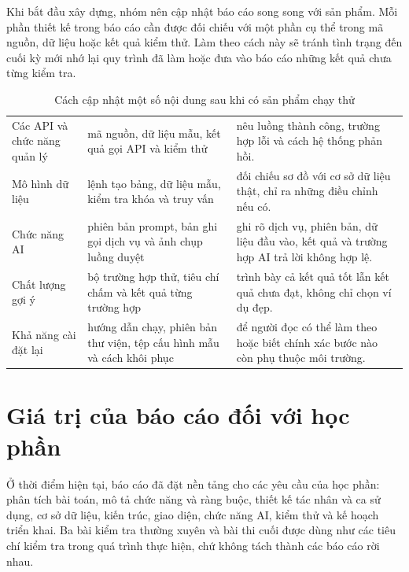 Khi bắt đầu xây dựng, nhóm nên cập nhật báo cáo song song với sản phẩm. Mỗi phần thiết kế trong báo cáo cần được đối chiếu với một phần cụ thể trong mã nguồn, dữ liệu hoặc kết quả kiểm thử. Làm theo cách này sẽ tránh tình trạng đến cuối kỳ mới nhớ lại quy trình đã làm hoặc đưa vào báo cáo những kết quả chưa từng kiểm tra.

\begin{table}[h!]
\centering
\small
\caption{Cách cập nhật một số nội dung sau khi có sản phẩm chạy thử}\label{tab:v8-update-protocol}
\begin{tabularx}{\textwidth}{|L{4.0cm}|L{4.0cm}|Y|}
\hline
{} &  & \\
\hline
Các API và chức năng quản lý & mã nguồn, dữ liệu mẫu, kết quả gọi API và kiểm thử & nêu luồng thành công, trường hợp lỗi và cách hệ thống phản hồi.\\
\hline
Mô hình dữ liệu & lệnh tạo bảng, dữ liệu mẫu, kiểm tra khóa và truy vấn & đối chiếu sơ đồ với cơ sở dữ liệu thật, chỉ ra những điều chỉnh nếu có.\\
\hline
Chức năng AI & phiên bản prompt, bản ghi gọi dịch vụ và ảnh chụp luồng duyệt & ghi rõ dịch vụ, phiên bản, dữ liệu đầu vào, kết quả và trường hợp AI trả lời không hợp lệ.\\
\hline
Chất lượng gợi ý & bộ trường hợp thử, tiêu chí chấm và kết quả từng trường hợp & trình bày cả kết quả tốt lẫn kết quả chưa đạt, không chỉ chọn ví dụ đẹp.\\
\hline
Khả năng cài đặt lại & hướng dẫn chạy, phiên bản thư viện, tệp cấu hình mẫu và cách khôi phục & để người đọc có thể làm theo hoặc biết chính xác bước nào còn phụ thuộc môi trường.\\
\hline
\end{tabularx}
\end{table}

\section{Giá trị của báo cáo đối với học phần}

Ở thời điểm hiện tại, báo cáo đã đặt nền tảng cho các yêu cầu của học phần: phân tích bài toán, mô tả chức năng và ràng buộc, thiết kế tác nhân và ca sử dụng, cơ sở dữ liệu, kiến trúc, giao diện, chức năng AI, kiểm thử và kế hoạch triển khai. Ba bài kiểm tra thường xuyên và bài thi cuối được dùng như các tiêu chí kiểm tra trong quá trình thực hiện, chứ không tách thành các báo cáo rời nhau.

